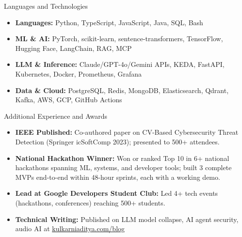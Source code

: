 \documentclass[]{mcdowellcv}
\begin{document}
\begin{cvsection}{Languages and Technologies}
  \begin{cvsubsection}{}{}{}
    \begin{itemize}
      \item \textbf{Languages:} Python, TypeScript, JavaScript, Java, SQL, Bash
      \item \textbf{ML \& AI:} PyTorch, scikit-learn, sentence-transformers, TensorFlow, Hugging Face, LangChain, RAG, MCP
      \item \textbf{LLM \& Inference:} Claude/GPT-4o/Gemini APIs, KEDA, FastAPI, Kubernetes, Docker, Prometheus, Grafana
      \item \textbf{Data \& Cloud:} PostgreSQL, Redis, MongoDB, Elasticsearch, Qdrant, Kafka, AWS, GCP, GitHub Actions
    \end{itemize}
  \end{cvsubsection}
\end{cvsection}

\begin{cvsection}{Additional Experience and Awards}
  \begin{cvsubsection}{}{}{}
    \begin{itemize}
      \item \textbf{IEEE Published:} Co-authored paper on CV-Based Cybersecurity Threat Detection (Springer icSoftComp 2023); presented to 500+ attendees.
      \item \textbf{National Hackathon Winner:} Won or ranked Top 10 in 6+ national hackathons spanning ML, systems, and developer tools; built 3 complete MVPs end-to-end within 48-hour sprints, each with a working demo.
      \item \textbf{Lead at Google Developers Student Club:} Led 4+ tech events (hackathons, conferences) reaching 500+ students.
      \item \textbf{Technical Writing:} Published on LLM model collapse, AI agent security, audio AI at \href{https://www.kulkarniaditya.com/blog}{kulkarniaditya.com/blog}
    \end{itemize}
  \end{cvsubsection}
\end{cvsection}
\end{document}
